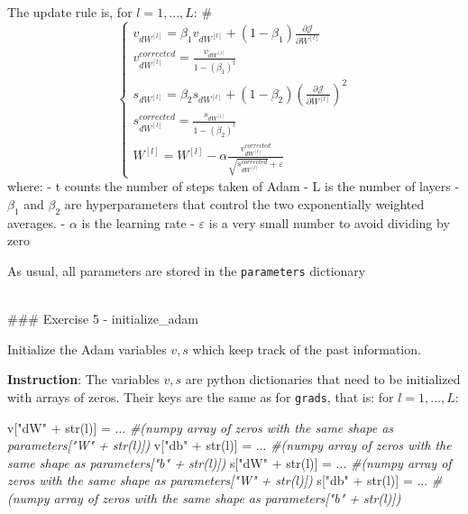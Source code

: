 \documentclass[11pt]{article}
\newenvironment{Shaded}{}{}
\newcommand{\StringTok}[1]{\textcolor[rgb]{0.25,0.44,0.63}{{#1}}}
\newcommand{\CommentTok}[1]{\textcolor[rgb]{0.38,0.63,0.69}{\textit{{#1}}}}
\newcommand{\NormalTok}[1]{{#1}}
\newcommand{\OperatorTok}[1]{\textcolor[rgb]{0.40,0.40,0.40}{{#1}}}
\newcommand{\BuiltInTok}[1]{{#1}}
\begin{document}
The update rule is, for \(l = 1, ..., L\): \# \[\begin{cases}
v_{dW^{[l]}} = \beta_1 v_{dW^{[l]}} + (1 - \beta_1) \frac{\partial \mathcal{J} }{ \partial W^{[l]} } \\
v^{corrected}_{dW^{[l]}} = \frac{v_{dW^{[l]}}}{1 - (\beta_1)^t} \\
s_{dW^{[l]}} = \beta_2 s_{dW^{[l]}} + (1 - \beta_2) (\frac{\partial \mathcal{J} }{\partial W^{[l]} })^2 \\
s^{corrected}_{dW^{[l]}} = \frac{s_{dW^{[l]}}}{1 - (\beta_2)^t} \\
W^{[l]} = W^{[l]} - \alpha \frac{v^{corrected}_{dW^{[l]}}}{\sqrt{s^{corrected}_{dW^{[l]}}} + \varepsilon}
\end{cases}\] where: - t counts the number of steps taken of Adam - L is
the number of layers - \(\beta_1\) and \(\beta_2\) are hyperparameters
that control the two exponentially weighted averages. - \(\alpha\) is
the learning rate - \(\varepsilon\) is a very small number to avoid
dividing by zero

As usual, all parameters are stored in the \texttt{parameters}
dictionary

    ~\\
\#\#\# Exercise 5 - initialize\_adam

Initialize the Adam variables \(v, s\) which keep track of the past
information.

\textbf{Instruction}: The variables \(v, s\) are python dictionaries
that need to be initialized with arrays of zeros. Their keys are the
same as for \texttt{grads}, that is: for \(l = 1, ..., L\):

\begin{Shaded}
\begin{Highlighting}[]
\NormalTok{v[}\StringTok{"dW"} \OperatorTok{+} \BuiltInTok{str}\NormalTok{(l)] }\OperatorTok{=}\NormalTok{ ... }\CommentTok{\#(numpy array of zeros with the same shape as parameters["W" + str(l)])}
\NormalTok{v[}\StringTok{"db"} \OperatorTok{+} \BuiltInTok{str}\NormalTok{(l)] }\OperatorTok{=}\NormalTok{ ... }\CommentTok{\#(numpy array of zeros with the same shape as parameters["b" + str(l)])}
\NormalTok{s[}\StringTok{"dW"} \OperatorTok{+} \BuiltInTok{str}\NormalTok{(l)] }\OperatorTok{=}\NormalTok{ ... }\CommentTok{\#(numpy array of zeros with the same shape as parameters["W" + str(l)])}
\NormalTok{s[}\StringTok{"db"} \OperatorTok{+} \BuiltInTok{str}\NormalTok{(l)] }\OperatorTok{=}\NormalTok{ ... }\CommentTok{\#(numpy array of zeros with the same shape as parameters["b" + str(l)])}
\end{Highlighting}
\end{Shaded}
\end{document}
